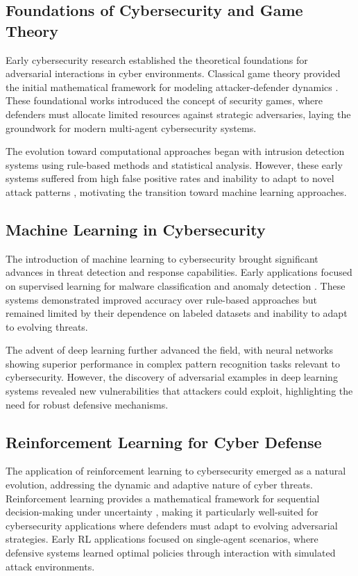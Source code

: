 \documentclass[12pt,twoside]{article}
\theoremstyle{definition}
\theoremstyle{plain}
\begin{document}
\subsection{Foundations of Cybersecurity and Game Theory}

Early cybersecurity research established the theoretical foundations for adversarial interactions in cyber environments. Classical game theory provided the initial mathematical framework for modeling attacker-defender dynamics \citep{alpcan2010network}. These foundational works introduced the concept of security games, where defenders must allocate limited resources against strategic adversaries, laying the groundwork for modern multi-agent cybersecurity systems.

The evolution toward computational approaches began with intrusion detection systems using rule-based methods and statistical analysis. However, these early systems suffered from high false positive rates and inability to adapt to novel attack patterns \citep{sommer2010outside}, motivating the transition toward machine learning approaches.

\subsection{Machine Learning in Cybersecurity}

The introduction of machine learning to cybersecurity brought significant advances in threat detection and response capabilities. Early applications focused on supervised learning for malware classification and anomaly detection \citep{sommer2010outside}. These systems demonstrated improved accuracy over rule-based approaches but remained limited by their dependence on labeled datasets and inability to adapt to evolving threats.

The advent of deep learning further advanced the field, with neural networks showing superior performance in complex pattern recognition tasks relevant to cybersecurity. However, the discovery of adversarial examples in deep learning systems \citep{goodfellow2014explaining} revealed new vulnerabilities that attackers could exploit, highlighting the need for robust defensive mechanisms.

\subsection{Reinforcement Learning for Cyber Defense}

The application of reinforcement learning to cybersecurity emerged as a natural evolution, addressing the dynamic and adaptive nature of cyber threats. Reinforcement learning provides a mathematical framework for sequential decision-making under uncertainty \citep{sutton2018reinforcement}, making it particularly well-suited for cybersecurity applications where defenders must adapt to evolving adversarial strategies. Early RL applications focused on single-agent scenarios, where defensive systems learned optimal policies through interaction with simulated attack environments.
\end{document}
